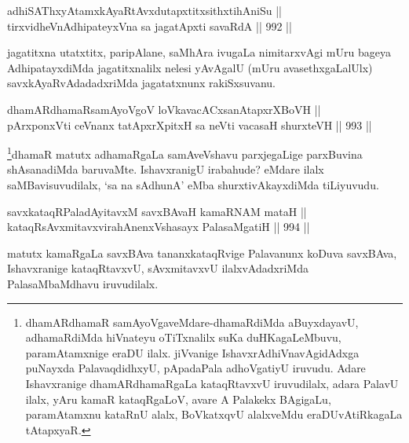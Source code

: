 \begin{shl}
adhiSAThxyA\s \s tamxkAyaRtAvxdutapxtitxsithxtihAniSu || \\
tirxvidheVnA\s \s dhipateyxVna sa jagatApxti savaRdA \hfill || 992 ||  
\end{shl}

\begin{artha}
jagatitxna utatxtitx, paripAlane, saMhAra ivugaLa nimitarxvAgi mUru bageya AdhipatayxdiMda jagatitxnalilx nelesi yAvAgalU (mUru avasethxgaLalUlx) savxkAyaRvAdadadxriMda jagatatxnunx rakiSxsuvanu.
\end{artha}


\begin{shl}
dhamARdhamaRsamAyoVgoV loVkavacACxsanAtapxrXBoVH || \\
pArxponxVti ceVnanx tatApxrXpitxH sa neVti vacasaH shurxteVH \hfill || 993 ||  
\end{shl}

\begin{artha}
\footnote{dhamARdhamaR samAyoVgaveMdare-dhamaRdiMda aBuyxdayavU, adhamaRdiMda hiVnateyu oTiTxnalilx suKa duHKagaLeMbuvu, paramAtamxnige eraDU ilalx. jiVvanige IshavxrAdhiVnavAgidAdxga puNayxda PalavaqdidhxyU, pApadaPala adhoVgatiyU iruvudu. Adare Ishavxranige dhamARdhamaRgaLa kataqRtavxvU iruvudilalx, adara PalavU ilalx, yAru kamaR kataqRgaLoV, avare A Palakekx BAgigaLu, paramAtamxnu kataRnU alalx, BoVkatxqvU alalxveMdu eraDUvAtiRkagaLa tAtapxyaR.}dhamaR matutx adhamaRgaLa samAveVshavu parxjegaLige parxBuvina shAsanadiMda baruvaMte. IshavxranigU irabahude? eMdare ilalx saMBavisuvudilalx, `sa na sAdhunA' eMba shurxtivAkayxdiMda tiLiyuvudu.
\end{artha}

\begin{shl}
\footnotemark[2]savxkataqRPaladAyitavxM savxBAvaH kamaRNAM mataH || \\
kataqRsAvxmitavxvirahAnenxVshasayx PalasaMgatiH \hfill || 994 ||  
\end{shl}

\begin{artha}
matutx kamaRgaLa savxBAva tananxkataqRvige Palavanunx koDuva savxBAva, Ishavxranige kataqRtavxvU, sAvxmitavxvU ilalxvAdadxriMda PalasaMbaMdhavu iruvudilalx.
\end{artha}


